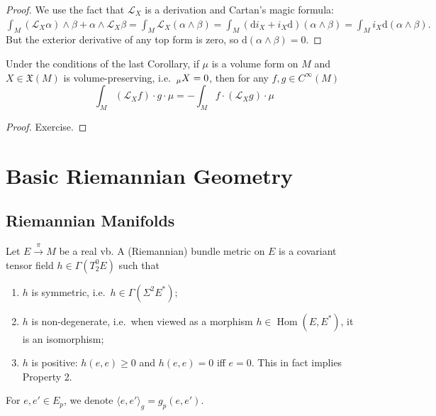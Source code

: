 \documentclass[english,letterpaper]{article}%
\numberwithin{equation}{section}
\numberwithin{figure}{section}
\numberwithin{table}{section}
\theoremstyle{definition}
\theoremstyle{definition}
\theoremstyle{definition}
\theoremstyle{plain}
\theoremstyle{plain}
\theoremstyle{plain}
\theoremstyle{plain}
\theoremstyle{remark}
\theoremstyle{remark}
\def\red{\color{red}}
\newcommand{\dd}{{\mathrm{d}}}
\renewcommand{\geq}{\geqslant}
\DeclareMathOperator{\Hom}{Hom}
\let\div\relax
\DeclareMathOperator{\div}{div}
\newcommand{\Lie}{\mathcal{L}}
\newcommand{\fX}{\mathfrak{X}}
\newcommand{\PRLsep}{   %
           \noindent\makebox[\linewidth]{
                \resizebox{0.5\linewidth}{1pt}{$\blacklozenge$}}}
\begin{document}
\begin{proof}
We use the fact that $\Lie_X$ is a derivation and Cartan's magic formula:
$\int_M (\Lie_X\alpha)\wedge\beta+\alpha\wedge\Lie_X\beta=\int_M \Lie_X (\alpha\wedge\beta)=\int_M (\dd i_X+i_X\dd)(\alpha\wedge\beta)=\int_M i_X \dd(\alpha\wedge\beta).$
But the exterior derivative of any top form is zero, so $\dd(\alpha\wedge\beta)=0$.
\end{proof}
\begin{cor}
Under the conditions of the last Corollary, if $\mu$ is a volume form on $M$ and $X\in\fX(M)$ is volume-preserving, i.e.\ $\div_\mu X=0$, then for any $f,g\in C^\infty(M)$
\[\int_M (\Lie_Xf)\cdot g\cdot \mu=-\int_M f\cdot (\Lie_Xg)\cdot \mu\]
\end{cor}
\begin{proof}
Exercise.
\end{proof}

\section{Basic Riemannian Geometry}

\subsection{Riemannian Manifolds}


\begin{defn}
Let $E\overset\pi\to M$ be a real \gls{vb}. A (Riemannian) bundle metric on $E$ is a covariant tensor field $h\in\Gamma(T^0_2 E)$ such that
\begin{enumerate}
    \item $h$ is symmetric, i.e.\ $h\in\Gamma(\Sigma^2 E^\ast)$;
    \item $h$ is non-degenerate, i.e.\ when viewed as a morphism $h\in\Hom(E,E^\ast)$, it is an isomorphism;
    \item $h$ is positive: $h(e,e)\geq 0$ and $h(e,e)=0$ iff $e=0$. This in fact implies Property 2.
\end{enumerate}
For $e,e'\in E_p$, we denote $\langle e,e'\rangle_g=g_p(e,e')$.
\end{defn}
\end{document}
